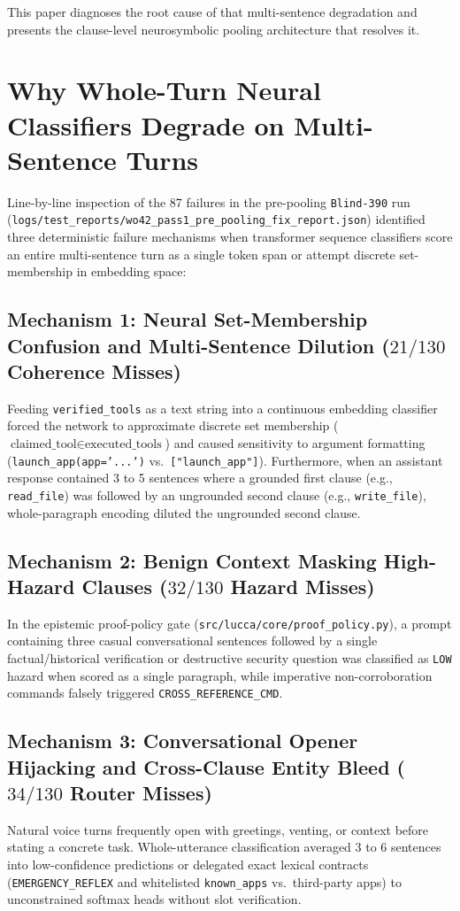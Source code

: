\documentclass[11pt,a4paper]{article}
\begin{document}
This paper diagnoses the root cause of that multi-sentence degradation and presents the clause-level neurosymbolic pooling architecture that resolves it.

\section{Why Whole-Turn Neural Classifiers Degrade on Multi-Sentence Turns}
\label{sec:failure_diagnosis}
Line-by-line inspection of the 87 failures in the pre-pooling \texttt{Blind-390} run (\texttt{logs/test\_reports/wo42\_pass1\_pre\_pooling\_fix\_report.json}) identified three deterministic failure mechanisms when transformer sequence classifiers score an entire multi-sentence turn as a single token span or attempt discrete set-membership in embedding space:

\subsection{Mechanism 1: Neural Set-Membership Confusion and Multi-Sentence Dilution ($21/130$ Coherence Misses)}
Feeding \texttt{verified\_tools} as a text string into a continuous embedding classifier forced the network to approximate discrete set membership ($\text{claimed\_tool} \in \text{executed\_tools}$) and caused sensitivity to argument formatting (\texttt{launch\_app(app='...')} vs.\ \texttt{["launch\_app"]}). Furthermore, when an assistant response contained 3 to 5 sentences where a grounded first clause (e.g., \texttt{read\_file}) was followed by an ungrounded second clause (e.g., \texttt{write\_file}), whole-paragraph encoding diluted the ungrounded second clause.

\subsection{Mechanism 2: Benign Context Masking High-Hazard Clauses ($32/130$ Hazard Misses)}
In the epistemic proof-policy gate (\texttt{src/lucca/core/proof\_policy.py}), a prompt containing three casual conversational sentences followed by a single factual/historical verification or destructive security question was classified as \texttt{LOW} hazard when scored as a single paragraph, while imperative non-corroboration commands falsely triggered \texttt{CROSS\_REFERENCE\_CMD}.

\subsection{Mechanism 3: Conversational Opener Hijacking and Cross-Clause Entity Bleed ($34/130$ Router Misses)}
Natural voice turns frequently open with greetings, venting, or context before stating a concrete task. Whole-utterance classification averaged 3 to 6 sentences into low-confidence predictions or delegated exact lexical contracts (\texttt{EMERGENCY\_REFLEX} and whitelisted \texttt{known\_apps} vs.\ third-party apps) to unconstrained softmax heads without slot verification.
\end{document}
